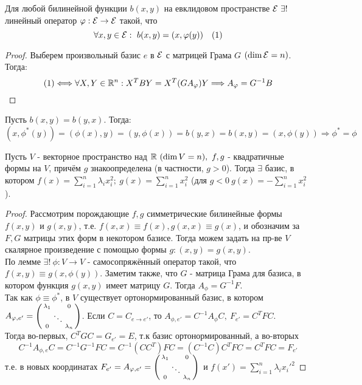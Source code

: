 \begin{lemma}
    Для любой билинейной функции $b(x, y)$ на евклидовом пространстве $\E \ \exists!$ линейный оператор $\varphi: \mathcal{E} \rightarrow \mathcal{E}$ такой, что
    $$\forall x, y \in \mathcal{E}: \ b(x, y) = (x, \varphi(y)) \ \ \ (1)$$
\end{lemma}
\begin{proof}
    Выберем произвольный базис $e$ в $\mathcal{E}$ с матрицей Грама $G$ $(\dim \mathcal{E} = n)$. Тогда:
    $$(1) \Longleftrightarrow \forall X, Y \in \mathbb{R}^n: X^TBY = X^T(GA_{\varphi})Y \Longrightarrow A_\varphi = G^{-1}B$$ 
\end{proof}
\begin{remark}
    Пусть $b(x, y) = b(y, x)$. Тогда:
    $$(x, \phi^*(y)) = (\phi(x), y) = (y, \phi(x)) = b(y, x) = b(x, y) = (x, \phi(y)) \Rightarrow \phi^* = \phi$$
\end{remark}
\begin{theorem}
    Пусть $V$ - векторное пространство над $\mathbb{R} \ (\dim V = n), \ f, g$ - квадратичные формы на $V$, причём $g$ знакоопределена (в частности, $g > 0$). Тогда $\exists$ базис, в котором $f(x) = \sum \limits_{i=1}^n \lambda_i x_i^2; \ g(x) = \sum \limits_{i=1}^n x_i^2$ (для $g < 0 \ g(x) = -\sum \limits_{i=1}^n x_i^2$ ). 
\end{theorem}
\begin{proof}
    Рассмотрим порождающие $f, g$ симметрические билинейные формы $f(x, y)$ и $g(x, y)$, т.е. $f(x,x) \equiv f(x), g(x, x) \equiv g(x)$, и обозначим за $F,G$ матрицы этих форм в некотором базисе. Тогда можем задать на пр-ве $V$ скалярное произведение с помощью формы $g: (x,y) = g(x,y)$.\\
    По лемме $\exists! \ \phi: V\rightarrow V$ - самосопряжённый оператор такой, что $f(x, y) \equiv g(x, \phi(y))$. Заметим также, что $G$ - матрица Грама для базиса, в котором функция $g(x, y)$ имеет матрицу $G$. Тогда $A_\phi = G^{-1}F$.\\
    Так как $\phi \equiv \phi^*$, в $V$ существует ортонормированный базис, в котором $A_{\phi, e'} = \begin{psmallmatrix}  \lambda_1&\null&0 \\ \null&\ddots&\null \\ 0&\null&\lambda_n \end{psmallmatrix}$. Если $C = C_{e\rightarrow e'}$, то $A_{\phi, e'} = C^{-1}A_\phi C, \ F_{e'} = C^TFC$.\\
    Тогда во-первых, $C^TGC = G_{e'} = E$, т.к базис ортонормированный, а во-вторых
    $$C^{-1}A_{\phi, e}C = C^{-1}G^{-1}FC = C^{-1}(CC^T)FC = (C^{-1}C)C^TFC = C^TFC = F_{e'}$$
    т.е. в новых координатах $F_{e'} = A_{\phi, e'} = \begin{psmallmatrix}  \lambda_1&\null&0 \\ \null&\ddots&\null \\ 0&\null&\lambda_n \end{psmallmatrix}$ и $f(x') = \sum \limits_{i=1}^n \lambda_i {x_i'}^2$
\end{proof}
